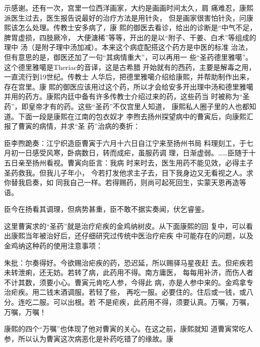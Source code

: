 示感谢。还有一次，宫里一位西洋画家，大约是画画时间太久，肩%
痛难忍，康熙派医生过去，医生报告说最好的治疗方法是用针灸，%
但是画家很害怕针灸，问康熙该怎么处理。传教士安多病了，康%
熙的御医去看诊，给出的诊断是“中气不足，脾胃虚损，四肢厥冷，%
大便溏稀”等等，开出的是以“附子、干姜、白术”等组成的理中%
汤（是附子理中汤加减）。本来这个病症配搭这个药方是中医的标准%
治法，但有意思的是，御医还加了一句“其病情重大”，可以再用一%
些“圣药德里雅噶”。这个德里雅噶是Theriac的音译，这是古希腊%
开始就有的西药，主要是解毒之用，一直流行到19世纪。传教士%
人华后，把德里雅噶介绍给康熙，并帮助制作出来，存在宫里。康%
熙的御医应该用过这个药，所以才会给安多开出理中汤和德里雅噶%
并用的药方。康熙内廷中备有许多传教士介绍过来的药，这些药当%
时被称为“圣药”，即皇帝才有的药。这些“圣药”不仅宫里人知道，%
康熙私人圈子里的人也都知道。下面一段是康熙在江南的包衣奴才%
李煦去扬州探望病中的曹寅后，向康熙汇报了曹寅的病情，并求“圣%
药”治病的奏折：%
\par
{\bookkai 臣李煦跪奏：江宁织造臣曹寅于六月十六日自江宁来至扬州书局}%
{\bookkai 料理刻工，于七月初一日感受风寒，卧病数日，转而成疟，虽服药调}%
{\bookkai 理，日渐虚弱。……臣随于十五日亲至扬州看视。曹寅向臣言：我病}%
{\bookkai 时来时去，医生用药不能见效，必得主子圣药救我。但我儿子年小，}%
{\bookkai 今若打发他求主子去，目下我身边又无看视之人。求你替我启奏，如}%
{\bookkai 同我自己一样。若得赐药，则尚可起死回生，实蒙天恩再造等语。}%
\par
{\bookkai 臣今在扬看其调理，但病势甚重，臣不敢不据实奏闻，伏乞睿鉴。}%
\par
这里曹寅求的“圣药”就是治疗疟疾的金鸡纳树皮。从下面康熙的回%
复中，可以看出康熙当年被治好后，还仔细研究过传统中医治疗疟疾%
中可能存在的问题，以及金鸡纳这种药的使用注意事项：%
\par
{\bookkai 朱批：尔奏得好。今欲赐治疟疾的药，恐迟延，所以赐驿马星夜赶}%
{\bookkai 去。但疟疾若未转泄痢，还无妨。若转了病，此药用不得。南方庸医，}%
{\bookkai 每每用补济，而伤人者不计其数，须要小心。曹寅元肯吃人参，今得此}%
{\bookkai 病，亦是人参中来的。金鸡拿专治疟疾。用二钱末酒调服。若轻了些，}%
{\bookkai 再吃一服。必要住的。住后或一钱，或八分。连吃二服。可以出根。若}%
{\bookkai 不是疟疾，此药用不得，须要认真。万嘱，万嘱，万嘱，万嘱！}%
\par
康熙的四个“万嘱”也体现了他对曹寅的关心。在这之前，康熙就知%
道曹寅常吃人参，所以认为曹寅这次病恶化是补药吃错了的缘故。康%
